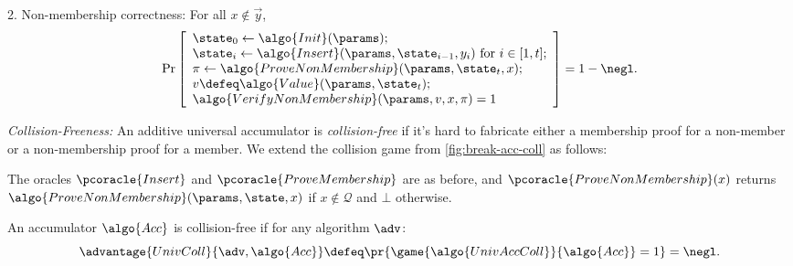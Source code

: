 \begin{mysolution}
  2. Non-membership correctness: For all $x \notin \vec{y}$,
  \[
    \Pr\left[
    \begin{array}{l}
      \state_0 \gets \algo{Init}(\params); \\
      \state_i \gets \algo{Insert}(\params, \state_{i-1}, y_i) \text{ for } i \in [1, t]; \\
      \pi \gets \algo{ProveNonMembership}(\params, \state_t, x); \\
      v \defeq \algo{Value}(\params, \state_t); \\
      \algo{VerifyNonMembership}(\params, v, x, \pi) = 1
    \end{array}
    \right] = 1 - \negl.
  \]
  
  \emph{Collision-Freeness:} An additive universal accumulator is \emph{collision-free} if it's hard to fabricate either a membership proof for a non-member or a non-membership proof for a member.
  We extend the collision game from \autoref{fig:break-acc-coll} as follows:
  
  \begin{center}
    \begin{tcolorbox}[width=13cm]
      \begin{pcvstack}[center]
      \end{pcvstack}
    \end{tcolorbox}
  \end{center}
  
  The oracles $\pcoracle{Insert}$ and $\pcoracle{ProveMembership}$ are as before, and $\pcoracle{ProveNonMembership}(x)$ returns $\algo{ProveNonMembership}(\params, \state, x)$ if $x \notin \mathcal{Q}$ and $\bot$ otherwise.
  
  An accumulator $\algo{Acc}$ is collision-free if for any \ppt algorithm $\adv$:
  \[
    \advantage{UnivColl}{\adv, \algo{Acc}} \defeq \pr{\game{\algo{UnivAccColl}}{\algo{Acc}} = 1} = \negl.
  \]
\end{mysolution}
\fi

